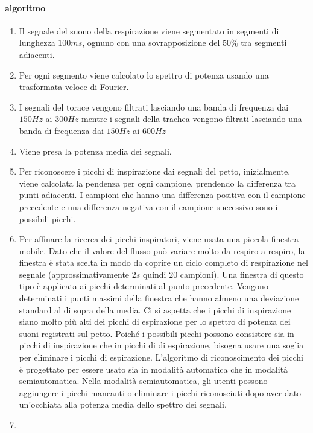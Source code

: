 \begin{frame}
  \paragraph{algoritmo}
    \begin{enumerate}
      \item 
	Il segnale del suono della respirazione viene segmentato in segmenti di lunghezza $100ms$, ognuno con una sovrapposizione del $50\%$ tra segmenti adiacenti. 
      \item
	Per ogni segmento viene calcolato lo spettro di potenza usando una trasformata veloce di Fourier.
      \item
	I segnali del torace vengono filtrati lasciando una banda di frequenza dai $150Hz$ ai $300Hz$ mentre i segnali della trachea vengono filtrati lasciando una banda di frequenza dai $150Hz$ ai $600Hz$
      \item
	Viene presa la potenza media dei segnali.
      \item
	Per riconoscere i picchi di inspirazione dai segnali del petto, inizialmente, viene calcolata la pendenza per ogni campione, prendendo la differenza tra punti adiacenti. 
	I campioni che hanno una differenza positiva con il campione precedente e una differenza negativa con il campione successivo sono i possibili picchi.
      \item
	Per affinare la ricerca dei picchi inspiratori, viene usata una piccola finestra mobile. 
	Dato che il valore del flusso pu\`o variare molto da respiro a respiro, la finestra \`e stata scelta in modo da coprire un ciclo completo di respirazione nel segnale (approssimativamente $2s$ quindi $20$ campioni). Una finestra di questo tipo \`e applicata ai picchi determinati al punto precedente. Vengono determinati i punti massimi della finestra che hanno almeno una deviazione standard al di sopra della media. 
	Ci si aspetta che i picchi di inspirazione siano molto pi\`u alti dei picchi di espirazione per lo spettro di potenza dei suoni registrati sul petto. 
	Poich\'e i possibili picchi possono consistere sia in picchi di inspirazione che in picchi di di espirazione, bisogna usare una soglia per eliminare i  picchi di espirazione. 
	L'algoritmo di riconoscimento dei picchi \`e progettato per essere usato sia in modalit\`a automatica che in modalit\`a semiautomatica. 
	Nella modalit\`a semiautomatica, gli utenti possono aggiungere i picchi mancanti o eliminare i picchi riconosciuti dopo aver dato un'occhiata alla potenza media dello spettro dei segnali.
      \item

\end{enumerate}
\end{frame}
